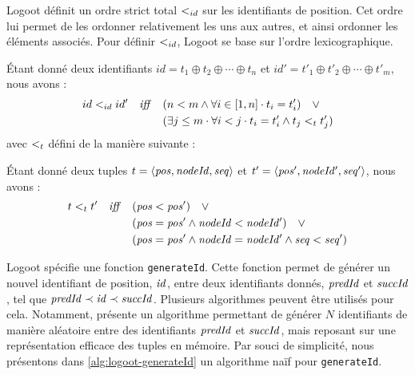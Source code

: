 Logoot définit un ordre strict total $<_{id}$ sur les identifiants de position.
Cet ordre lui permet de les ordonner relativement les uns aux autres, et ainsi ordonner les éléments associés.
Pour définir $<_{id}$, Logoot se base sur l'ordre lexicographique.
\begin{definition}
  Étant donné deux identifiants $id = t_1 \oplus t_2 \oplus \cdots \oplus t_n$ et $id' = t'_1 \oplus t'_2 \oplus \cdots \oplus t'_m$, nous avons :
  \begin{equation*}
    \begin{split}
      id <_{id} id' \quad \mathit{iff} \quad     & (n < m \land \forall i \in [1,n] \cdot t_i = t'_i) \quad \lor \\
                                            & (\exists j \leq m \cdot \forall i < j \cdot t_i = t'_i \land t_j <_{t} t'_j) \\
    \end{split}
  \end{equation*}
  avec $<_{t}$ défini de la manière suivante :
  \begin{subdefinition}
    Étant donné deux tuples $t = \langle \mathit{pos},\mathit{nodeId},\mathit{seq} \rangle$ et $t' = \langle \mathit{pos'},\mathit{nodeId'},\mathit{seq'} \rangle$, nous avons :
    \begin{equation*}
      \begin{split}
        t <_{t} t' \quad \mathit{iff} \quad  & (\mathit{pos} < \mathit{pos}') \quad \lor \\
                                            & (\mathit{pos} = \mathit{pos'} \land \mathit{nodeId} < \mathit{nodeId'}) \quad \lor \\
                                            & (\mathit{pos} = \mathit{pos'} \land \mathit{nodeId} = \mathit{nodeId'} \land \mathit{seq} < \mathit{seq'}) \\
      \end{split}
    \end{equation*}
  \end{subdefinition}
\end{definition}

Logoot spécifie une fonction \texttt{generateId}.
Cette fonction permet de générer un nouvel identifiant de position, $\mathit{id}$, entre deux identifiants donnés, $\mathit{predId}$ et $\mathit{succId}$, tel que $\mathit{predId} \prec \mathit{id} \prec \mathit{succId}$.
Plusieurs algorithmes peuvent être utilisés pour cela.
Notamment, \cite{2009-logoot-weiss} présente un algorithme permettant de générer $N$ identifiants de manière aléatoire entre des identifiants $\mathit{predId}$ et $\mathit{succId}$, mais reposant sur une représentation efficace des tuples en mémoire.
Par souci de simplicité, nous présentons dans \autoref{alg:logoot-generateId} un algorithme naïf pour \texttt{generateId}.

